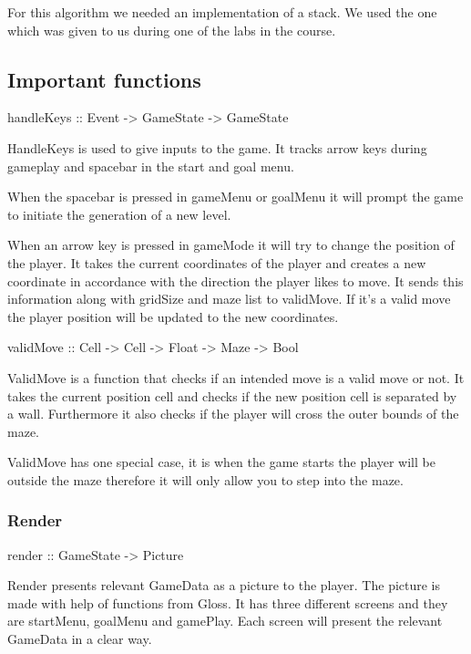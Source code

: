 \documentclass[12pt, a4paper]{article}
\begin{document}
For this algorithm we needed an implementation of a stack. We used the one which was given to us during one of the labs in the course. 






\subsection{Important functions}


\begin{code}
    handleKeys :: Event -> GameState -> GameState
\end{code}

HandleKeys is used to give inputs to the game. It tracks arrow keys during gameplay and spacebar in the start and goal menu.
 
When the spacebar is pressed in gameMenu or goalMenu it will prompt the game to initiate the generation of a new level.
 
When an arrow key is pressed in gameMode it will try to change the position of the player. It takes the current coordinates of the player and creates a new coordinate in accordance with the direction the player likes to move. It sends this information along with gridSize and maze list to validMove. If it’s a valid move the player position will be updated to the new coordinates.


\begin{code}
    validMove :: Cell -> Cell -> Float -> Maze -> Bool
\end{code}
ValidMove is a function that checks if an intended move is a valid move or not. It takes the current position cell and checks if the new position cell is separated by a wall.
Furthermore it also checks if the player will cross the outer bounds of the maze.
 
ValidMove has one special case, it is when the game starts the player will be outside the maze therefore it will only allow you to step into the maze.


\subsubsection*{Render}
\begin{code}
    render :: GameState -> Picture
\end{code}
Render presents relevant GameData as a picture to the player. The picture is made with help of functions from Gloss. It has three different screens and they are startMenu, goalMenu and gamePlay. Each screen will present the relevant GameData in a clear way.
 
\end{document}
